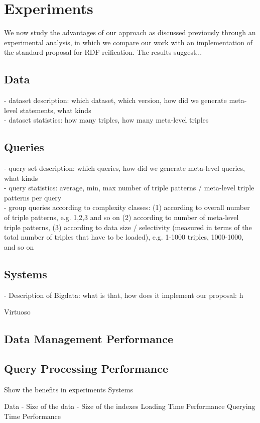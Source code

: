 \section{Experiments}
We now study the advantages of our approach as discussed previously through an experimental analysis, in which we compare our work with an implementation of the standard proposal for RDF reification. The results suggest... 

\subsection{Data}
-	dataset description: which dataset, which version, how did we generate meta-level statements, what kinds\\
- dataset statistics: how many triples, how many meta-level triples\\

\subsection{Queries}
-	query set description: which queries, how did we generate meta-level queries, what kinds\\
- query statistics: average, min, max number of triple patterns / meta-level triple patterns per query\\ 
- group queries according to complexity classes: (1) according to overall number of triple patterns, e.g. 1,2,3 and so on (2) according to number of meta-level triple patterns, (3) according to data size / selectivity (measured in terms of the total number of triples that have to be loaded), e.g. 1-1000 triples, 1000-1000, and so on\\

\subsection{Systems}
- Description of Bigdata: what is that, how does it implement our proposal: h

Virtuoso

\subsection{Data Management Performance}


\subsection{Query Processing Performance}

Show the benefits in experiments
Systems

Data
-	Size of the data
-	Size of the indexes 
Loading Time Performance
Querying Time Performance

